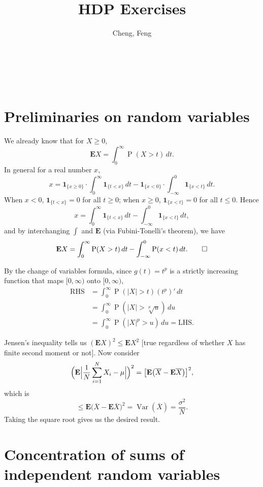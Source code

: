 \documentclass[11pt]{article}
\title{HDP Exercises}
\author{Cheng, Feng}
\date{}
\makeatletter
\newcommand{\abs}[1]{\lvert #1 \rvert}
\newcommand{\ol}[1]{\overline{#1}}
\renewcommand{\Pr}{\operatorname{P}}
\newcommand{\E}{\mathbf{E}}
\newcommand{\I}[1]{\mathbf{1}_{\{#1\}}}
\newcommand{\Var}{\operatorname{Var}}
\theoremstyle{plain}
\theoremstyle{definition}
\theoremstyle{remark}
\theoremstyle{definition}
\newenvironment{mansol}[1]{%
  \renewcommand\themansolinner{#1}%
  \mansolinner
}{\endmansolinner}
\let\@subtitle\@empty %
\renewcommand{\maketitle}{
    \begin{center}
        {\Large \@title}
        \@subtitle
        \vspace{0.5em}
        \\ \@author \\ \@date
        \vspace{-0.5em}
    \end{center}
}
\makeatother
\begin{document}
\maketitle

\section{Preliminaries on random variables}
\begin{mansol}{1.2.2}
    We already know that for $X \geq 0$, \[\E X = \int_{0}^\infty \Pr(X > t) \, dt.\] In general for a real number $x$, \[
    x = \I{x \geq 0} \cdot \int_0^\infty \I{t < x} \,dt - \I{x < 0} \cdot \int_{-\infty}^0 \I{x < t} \,dt.
\]
When $x<0$, $\I{t<x} = 0$ for all $t\geq 0$; when $x \geq 0$, $\I{x<t} = 0$ for all $t \leq 0$. Hence \[x = \int_0^\infty \I{t < x} \,dt - \int_{-\infty}^0 \I{x < t} \,dt,
\]
and by interchanging $\int$ and $\E$ (via Fubini-Tonelli's theorem), we have \[ \E X = \int_{0}^\infty \Pr(X > t) \, dt - \int_{-\infty}^0 \Pr(x < t) \,dt. \qedhere\]
\end{mansol}

\begin{mansol}{1.2.3}
By the change of variables formula, since $g(t) = t^p$ is a strictly increasing function that maps $[0,\infty)$ onto $[0,\infty)$,
\begin{align*}
\text{RHS} & = \int_0^\infty \Pr(\abs X  > t) (t^p)'\,dt \\
& = \int_0^\infty \Pr(\abs X > \sqrt[p]{u})\,du \\ & = \int_0^\infty \Pr(\abs X ^p > u) \,du = \text{LHS}.
\end{align*}
\end{mansol}

\begin{mansol}{1.3.3}
Jensen's inequality tells us $(\E X)^2 \leq \E X^2$ [true regardless of whether $X$ has finite second moment or not]. Now consider \[
\Bigl(\E \Big\lvert\frac{1}{N} \sum_{i=1}^N X_i - \mu\Big\rvert \Bigr)^2 = \bigl[\E\bigl(\ol{X} - \E\ol{X}\bigr)\bigr]^2,
\] which is
\[
\leq \E \bigl(\ol X - \E \ol X \bigr)^2 = \Var(\ol X) = \frac{\sigma^2}{N}.
\]
Taking the square root gives us the desired result.
\end{mansol}

\section{Concentration of sums of independent random variables}
\end{document}
